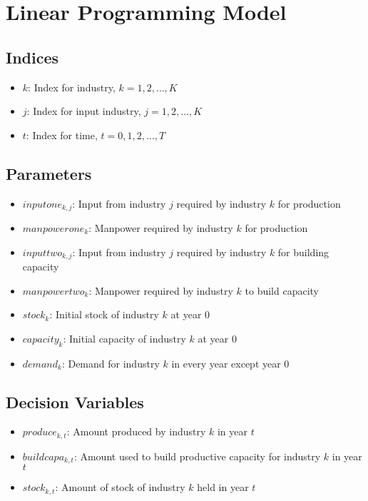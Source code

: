 \documentclass{article}
\begin{document}
\section*{Linear Programming Model}

\subsection*{Indices}
\begin{itemize}
    \item $k$: Index for industry, $k = 1, 2, \ldots, K$
    \item $j$: Index for input industry, $j = 1, 2, \ldots, K$
    \item $t$: Index for time, $t = 0, 1, 2, \ldots, T$
\end{itemize}

\subsection*{Parameters}
\begin{itemize}
    \item $inputone_{k,j}$: Input from industry $j$ required by industry $k$ for production
    \item $manpowerone_k$: Manpower required by industry $k$ for production
    \item $inputtwo_{k,j}$: Input from industry $j$ required by industry $k$ for building capacity
    \item $manpowertwo_k$: Manpower required by industry $k$ to build capacity
    \item $stock_k$: Initial stock of industry $k$ at year 0
    \item $capacity_k$: Initial capacity of industry $k$ at year 0
    \item $demand_k$: Demand for industry $k$ in every year except year 0
\end{itemize}

\subsection*{Decision Variables}
\begin{itemize}
    \item $produce_{k,t}$: Amount produced by industry $k$ in year $t$
    \item $buildcapa_{k,t}$: Amount used to build productive capacity for industry $k$ in year $t$
    \item $stock_{k,t}$: Amount of stock of industry $k$ held in year $t$
\end{itemize}
\end{document}
